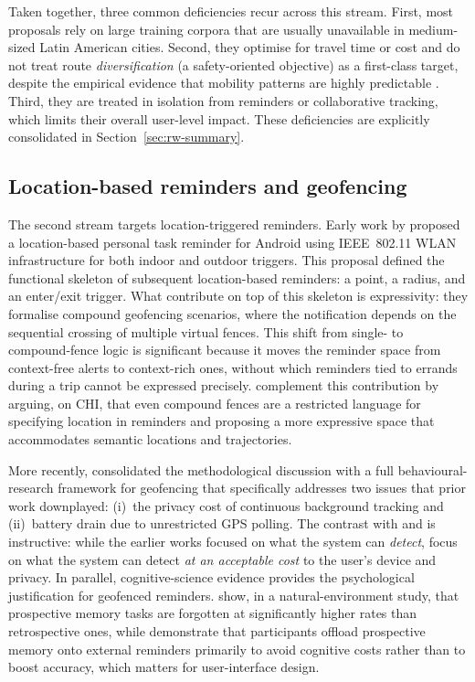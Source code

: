 \documentclass[a4paper,fleqn]{cas-sc}
\begin{document}
	Taken together, three common deficiencies recur across this stream. First, most proposals rely on large training corpora that are usually unavailable in medium-sized Latin American cities. Second, they optimise for travel time or cost and do not treat route \emph{diversification} (a safety-oriented objective) as a first-class target, despite the empirical evidence that mobility patterns are highly predictable \citep{song2010predictability,cagney2025urban,liu2022route}. Third, they are treated in isolation from reminders or collaborative tracking, which limits their overall user-level impact. These deficiencies are explicitly consolidated in Section~\ref{sec:rw-summary}.
	
	\subsection{Location-based reminders and geofencing}\label{sec:rw-reminders}
	
	The second stream targets location-triggered reminders. Early work by \citet{lin2014lbr} proposed a location-based personal task reminder for Android using IEEE~802.11 WLAN infrastructure for both indoor and outdoor triggers. This proposal defined the functional skeleton of subsequent location-based reminders: a point, a radius, and an enter/exit trigger. What \citet{garzon2014geofencing} contribute on top of this skeleton is expressivity: they formalise compound geofencing scenarios, where the notification depends on the sequential crossing of multiple virtual fences. This shift from single- to compound-fence logic is significant because it moves the reminder space from context-free alerts to context-rich ones, without which reminders tied to errands during a trip cannot be expressed precisely. \citet{wang2015beyond} complement this contribution by arguing, on CHI, that even compound fences are a restricted language for specifying location in reminders and proposing a more expressive space that accommodates semantic locations and trajectories.
	
	More recently, \citet{shevchenko2024geofencing} consolidated the methodological discussion with a full behavioural-research framework for geofencing that specifically addresses two issues that prior work downplayed: (i)~the privacy cost of continuous background tracking and (ii)~battery drain due to unrestricted GPS polling. The contrast with \citet{lin2014lbr} and \citet{garzon2014geofencing} is instructive: while the earlier works focused on what the system can \emph{detect}, \citet{shevchenko2024geofencing} focus on what the system can detect \emph{at an acceptable cost} to the user's device and privacy. In parallel, cognitive-science evidence provides the psychological justification for geofenced reminders. \citet{rummel2023prospective} show, in a natural-environment study, that prospective memory tasks are forgotten at significantly higher rates than retrospective ones, while \citet{ball2025offloading} demonstrate that participants offload prospective memory onto external reminders primarily to avoid cognitive costs rather than to boost accuracy, which matters for user-interface design.
	
\end{document}
